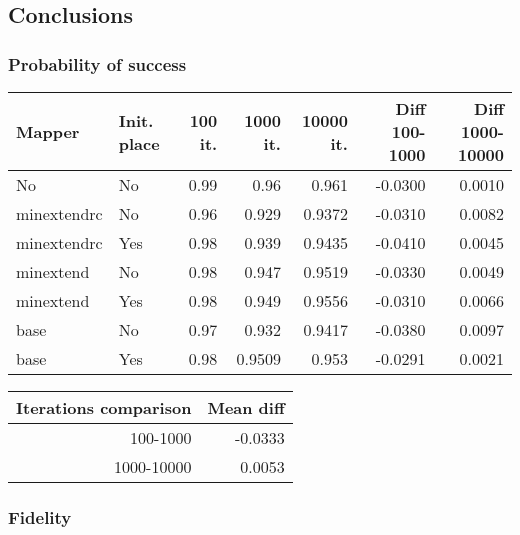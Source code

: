 \documentclass[11pt]{article}
\begin{document}
\subsection{Conclusions}
\label{sec:org2363ddb}


\subsubsection{Probability of success}
\label{sec:org3ccb5e4}
\begin{center}
\label{tab:orgb3f8321}
\begin{tabular}{llrrrrr}
\hline
Mapper & Init. place & 100 it. & 1000 it. & 10000 it. & Diff 100-1000 & Diff 1000-10000\\
\hline
No & No & 0.99 & 0.96 & 0.961 & -0.0300 & 0.0010\\
\hline
minextendrc & No & 0.96 & 0.929 & 0.9372 & -0.0310 & 0.0082\\
minextendrc & Yes & 0.98 & 0.939 & 0.9435 & -0.0410 & 0.0045\\
minextend & No & 0.98 & 0.947 & 0.9519 & -0.0330 & 0.0049\\
minextend & Yes & 0.98 & 0.949 & 0.9556 & -0.0310 & 0.0066\\
base & No & 0.97 & 0.932 & 0.9417 & -0.0380 & 0.0097\\
base & Yes & 0.98 & 0.9509 & 0.953 & -0.0291 & 0.0021\\
\hline
\end{tabular}
\end{center}

\begin{center}
\begin{tabular}{rr}
\hline
Iterations comparison & Mean diff\\
\hline
100-1000 & -0.0333\\
1000-10000 & 0.0053\\
\hline
\end{tabular}
\end{center}




\subsubsection{Fidelity}
\label{sec:org65fff6c}
\end{document}
